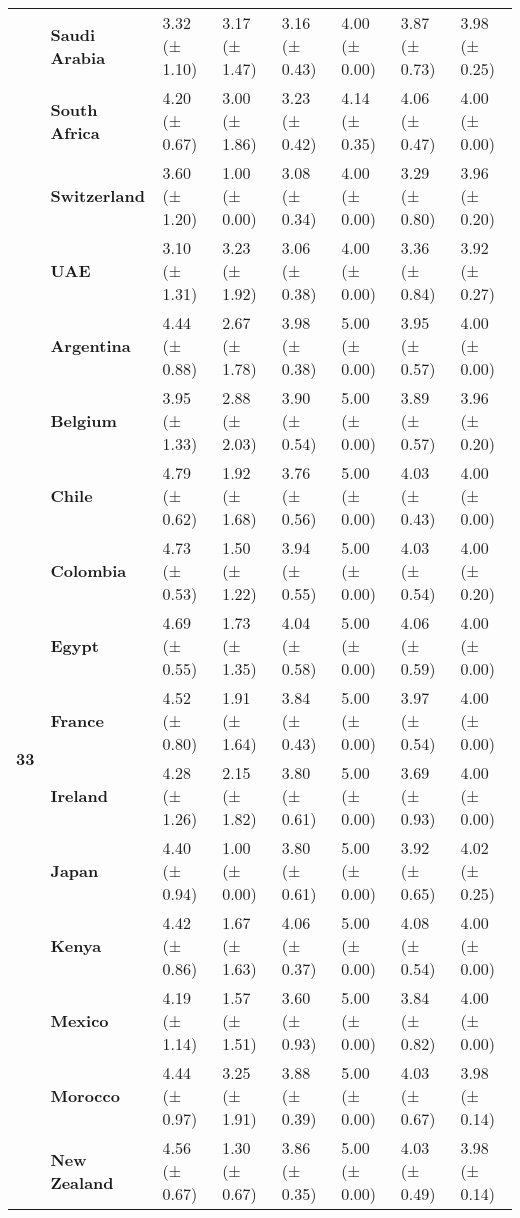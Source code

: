 \begin{longtable}{llllllll}
\textbf{} & \textbf{Saudi Arabia} & 3.32 (± 1.10) & 3.17 (± 1.47) & 3.16 (± 0.43) & 4.00 (± 0.00) & 3.87 (± 0.73) & 3.98 (± 0.25) \\
\textbf{} & \textbf{South Africa} & 4.20 (± 0.67) & 3.00 (± 1.86) & 3.23 (± 0.42) & 4.14 (± 0.35) & 4.06 (± 0.47) & 4.00 (± 0.00) \\
\textbf{} & \textbf{Switzerland} & 3.60 (± 1.20) & 1.00 (± 0.00) & 3.08 (± 0.34) & 4.00 (± 0.00) & 3.29 (± 0.80) & 3.96 (± 0.20) \\
\textbf{} & \textbf{UAE} & 3.10 (± 1.31) & 3.23 (± 1.92) & 3.06 (± 0.38) & 4.00 (± 0.00) & 3.36 (± 0.84) & 3.92 (± 0.27) \\
\cline{1-8}
\multirow[t]{19}{*}{\textbf{33}} & \textbf{Argentina} & 4.44 (± 0.88) & 2.67 (± 1.78) & 3.98 (± 0.38) & 5.00 (± 0.00) & 3.95 (± 0.57) & 4.00 (± 0.00) \\
\textbf{} & \textbf{Belgium} & 3.95 (± 1.33) & 2.88 (± 2.03) & 3.90 (± 0.54) & 5.00 (± 0.00) & 3.89 (± 0.57) & 3.96 (± 0.20) \\
\textbf{} & \textbf{Chile} & 4.79 (± 0.62) & 1.92 (± 1.68) & 3.76 (± 0.56) & 5.00 (± 0.00) & 4.03 (± 0.43) & 4.00 (± 0.00) \\
\textbf{} & \textbf{Colombia} & 4.73 (± 0.53) & 1.50 (± 1.22) & 3.94 (± 0.55) & 5.00 (± 0.00) & 4.03 (± 0.54) & 4.00 (± 0.20) \\
\textbf{} & \textbf{Egypt} & 4.69 (± 0.55) & 1.73 (± 1.35) & 4.04 (± 0.58) & 5.00 (± 0.00) & 4.06 (± 0.59) & 4.00 (± 0.00) \\
\textbf{} & \textbf{France} & 4.52 (± 0.80) & 1.91 (± 1.64) & 3.84 (± 0.43) & 5.00 (± 0.00) & 3.97 (± 0.54) & 4.00 (± 0.00) \\
\textbf{} & \textbf{Ireland} & 4.28 (± 1.26) & 2.15 (± 1.82) & 3.80 (± 0.61) & 5.00 (± 0.00) & 3.69 (± 0.93) & 4.00 (± 0.00) \\
\textbf{} & \textbf{Japan} & 4.40 (± 0.94) & 1.00 (± 0.00) & 3.80 (± 0.61) & 5.00 (± 0.00) & 3.92 (± 0.65) & 4.02 (± 0.25) \\
\textbf{} & \textbf{Kenya} & 4.42 (± 0.86) & 1.67 (± 1.63) & 4.06 (± 0.37) & 5.00 (± 0.00) & 4.08 (± 0.54) & 4.00 (± 0.00) \\
\textbf{} & \textbf{Mexico} & 4.19 (± 1.14) & 1.57 (± 1.51) & 3.60 (± 0.93) & 5.00 (± 0.00) & 3.84 (± 0.82) & 4.00 (± 0.00) \\
\textbf{} & \textbf{Morocco} & 4.44 (± 0.97) & 3.25 (± 1.91) & 3.88 (± 0.39) & 5.00 (± 0.00) & 4.03 (± 0.67) & 3.98 (± 0.14) \\
\textbf{} & \textbf{New Zealand} & 4.56 (± 0.67) & 1.30 (± 0.67) & 3.86 (± 0.35) & 5.00 (± 0.00) & 4.03 (± 0.49) & 3.98 (± 0.14) \\

\end{longtable}
